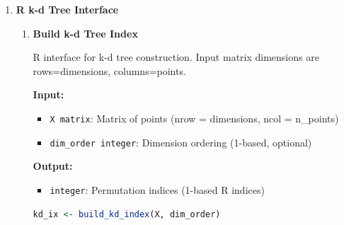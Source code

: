 \begin{enumerate}
\begin{enumerate}
            \item \textbf{Get Sorted Value}
                  
                  Retrieves value from sorted position using R 1-based indexing.
                  
                  \textbf{Input:}
                  \begin{itemize}
                    \item \texttt{x numeric}: Original values vector
                          
                    \item \texttt{ix integer}: BST index vector (1-based)
                          
                    \item \texttt{position integer}: Position in sorted order (1-based)
                  \end{itemize}
                  \textbf{Output:}
                  \begin{itemize}
                    \item \texttt{numeric}: Value at specified position
                  \end{itemize}
                  \begin{lstlisting}[language=R]
value <- get_sorted_value(x, ix, position)
                  \end{lstlisting}
          \end{enumerate}
          
    \item \textbf{R k-d Tree Interface}
          
          \begin{enumerate}
            \item \textbf{Build k-d Tree Index}
                  
                  R interface for k-d tree construction. Input matrix dimensions are
                  rows=dimensions, columns=points.
                  
                  \textbf{Input:}
                  \begin{itemize}
                    \item \texttt{X matrix}: Matrix of points (nrow = dimensions, ncol =
                          n\_points)
                          
                    \item \texttt{dim\_order integer}: Dimension ordering (1-based, optional)
                  \end{itemize}
                  \textbf{Output:}
                  \begin{itemize}
                    \item \texttt{integer}: Permutation indices (1-based R indices)
                  \end{itemize}
                  \begin{lstlisting}[language=R]
kd_ix <- build_kd_index(X, dim_order)
                  \end{lstlisting}
                  

\end{enumerate}
\end{enumerate}
